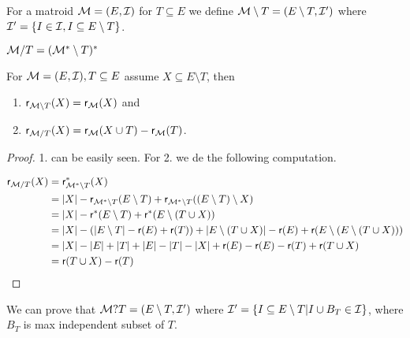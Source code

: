 \begin{defn}[Deletion]
	For a matroid $\mathcal{M} = (E, \mathcal{I})$ for $T \subseteq E$ we define $\mathcal{M} \setminus T = (E \setminus T, \mathcal{I}')$ where $\mathcal{I}' = \{I \in \mathcal{I}, I \subseteq E \setminus T\}$.
\end{defn}

\begin{defn}[Contraction]
	$\mathcal{M} / T = (\mathcal{M}^{\ast} \setminus T)^{\ast}$
\end{defn}

\begin{prop}
	For $\mathcal{M} = (E, \mathcal{I}), T \subseteq E$ assume $X \subseteq E \setminus T$, then
	
	\begin{enumerate}
		\item $\operatorname{\textsf{r}}_{\mathcal{M} \setminus T} (X) = \operatorname{\textsf{r}}_{\mathcal{M}} (X)$ and
		\item $\operatorname{\textsf{r}}_{\mathcal{M} / T}(X) = \operatorname{\textsf{r}}_{\mathcal{M}}(X \cup T) - \operatorname{\textsf{r}}_{\mathcal{M}}(T)$.
	\end{enumerate}
\end{prop}

\begin{proof}
	1. can be easily seen. For 2. we de the following computation.
	
	$$
	\begin{aligned}
		\operatorname{\textsf{r}}_{\mathcal{M} / T} (X) &= \operatorname{\textsf{r}}_{\mathcal{M}^{\ast} \setminus T}^{\ast} (X) \\
		&= |X| - \operatorname{\textsf{r}}_{\mathcal{M}^{\ast} \setminus T} (E \setminus T) + \operatorname{\textsf{r}}_{\mathcal{M}^{\ast} \setminus T} ((E \setminus T) \setminus X)\\
		&= |X| - \operatorname{\textsf{r}}^{\ast}(E \setminus T) + \operatorname{\textsf{r}}^{\ast}(E \setminus (T \cup X)) \\
		&= |X| - (|E \setminus T| - \operatorname{\textsf{r}}(E) + \operatorname{\textsf{r}}(T)) + |E \setminus (T \cup X)| - \operatorname{\textsf{r}}(E) + \operatorname{\textsf{r}}(E \setminus (E \setminus (T \cup X))) \\
		&= |X| - |E| + |T| + |E| - |T| - |X| + \operatorname{\textsf{r}}(E) - \operatorname{\textsf{r}}(E) - \operatorname{\textsf{r}}(T) + \operatorname{\textsf{r}}(T \cup X)\\
		&=\operatorname{\textsf{r}}(T \cup X) - \operatorname{\textsf{r}}(T)
	\end{aligned}
	$$
\end{proof}

\begin{prop}
	We can prove that $\mathcal{M} ? T = (E \setminus T, \mathcal{I}')$ where $\mathcal{I}' = \{I \subseteq E \setminus T | I \cup B_T \in \mathcal{I}\}$, where $B_T$ is max independent subset of $T$.
\end{prop}

